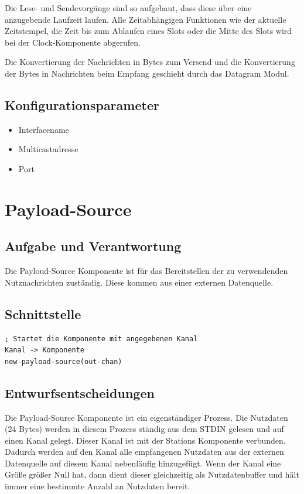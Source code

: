 \documentclass[draft=false
              ,paper=a4
              ,twoside=false
              ,fontsize=11pt
              ,headsepline
              ,BCOR10mm
              ,DIV11
              ]{scrbook}
\begin{document}
Die Lese- und Sendevorgänge sind so aufgebaut, dass diese über eine anzugebende Laufzeit laufen. Alle Zeitabhängigen Funktionen wie der aktuelle Zeitstempel, die Zeit bis zum Ablaufen eines Slots oder die Mitte des Slots wird bei der Clock-Komponente abgerufen.

Die Konvertierung der Nachrichten in Bytes zum Versend und die Konvertierung der Bytes in Nachrichten beim Empfang geschieht durch das Datagram Modul.

\subsection{Konfigurationsparameter}
\begin{itemize}
	\item Interfacename
	\item Multicastadresse
	\item Port
\end{itemize}

\section{Payload-Source}
\subsection{Aufgabe und Verantwortung}
Die Payloud-Source Komponente ist für das Bereitstellen der zu verwendenden Nutznachrichten zuständig. Diese kommen aus einer externen Datenquelle.

\subsection{Schnittstelle}
\begin{lstlisting}
; Startet die Komponente mit angegebenen Kanal
Kanal -> Komponente
new-payload-source(out-chan)
\end{lstlisting}

\subsection{Entwurfsentscheidungen}
Die Payload-Source Komponente ist ein eigenständiger Prozess. Die Nutzdaten (24 Bytes) werden in diesem Prozess ständig aus dem STDIN gelesen und auf einen Kanal gelegt. Dieser Kanal ist mit der Stations Komponente verbunden. Dadurch werden auf den Kanal alle empfangenen Nutzdaten aus der externen Datenquelle auf diesem Kanal nebenläufig hinzugefügt. Wenn der Kanal eine Größe größer Null hat, dann dient dieser gleichzeitig als Nutzdatenbuffer und hält immer eine bestimmte Anzahl an Nutzdaten bereit.
\end{document}
